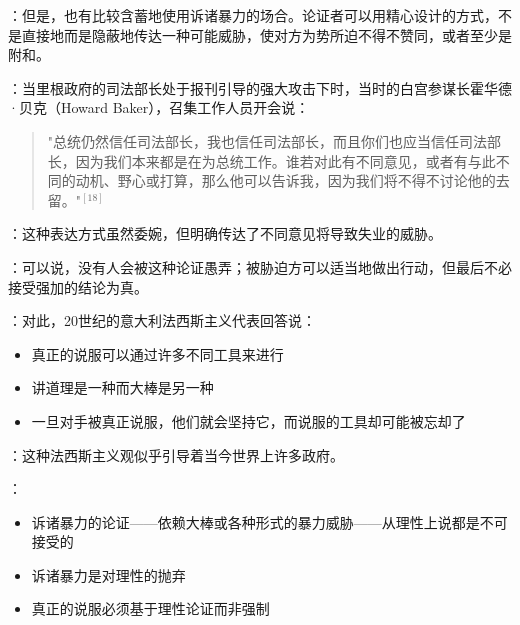 \begin{examplebox}[title=隐蔽的暴力威胁]
：但是，也有比较含蓄地使用诉诸暴力的场合。论证者可以用精心设计的方式，不是直接地而是隐蔽地传达一种可能威胁，使对方为势所迫不得不赞同，或者至少是附和。

：当里根政府的司法部长处于报刊引导的强大攻击下时，当时的白宫参谋长霍华德·贝克（Howard Baker），召集工作人员开会说：

\begin{quote}
"总统仍然信任司法部长，我也信任司法部长，而且你们也应当信任司法部长，因为我们本来都是在为总统工作。谁若对此有不同意见，或者有与此不同的动机、野心或打算，那么他可以告诉我，因为我们将不得不讨论他的去留。"$^{[18]}$
\end{quote}

：这种表达方式虽然委婉，但明确传达了不同意见将导致失业的威胁。
\end{examplebox}

\begin{theorembox}[title=理性与强制的对立]
：可以说，没有人会被这种论证愚弄；被胁迫方可以适当地做出行动，但最后不必接受强加的结论为真。

：对此，20世纪的意大利法西斯主义代表回答说：
\begin{itemize}
  \item 真正的说服可以通过许多不同工具来进行
  \item 讲道理是一种而大棒是另一种
  \item 一旦对手被真正说服，他们就会坚持它，而说服的工具却可能被忘却了
\end{itemize}

：这种法西斯主义观似乎引导着当今世界上许多政府。

：
\begin{itemize}
  \item 诉诸暴力的论证——依赖大棒或各种形式的暴力威胁——从理性上说都是不可接受的
  \item 诉诸暴力是对理性的抛弃
  \item 真正的说服必须基于理性论证而非强制
\end{itemize}
\end{theorembox}